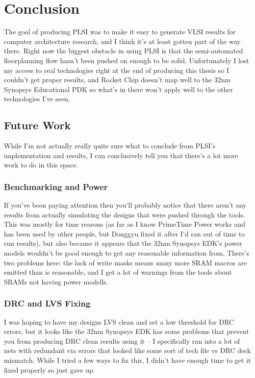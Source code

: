\documentclass{article}
\begin{document}
\chapter{Conclusion}

The goal of producing PLSI was to make it easy to generate VLSI results for
computer architecture research, and I think it's at least gotten part of the
way there.  Right now the biggest obstacle in using PLSI is that the
semi-automated floorplanning flow hasn't been pushed on enough to be solid.
Unfortunately I lost my access to real technologies right at the end of
producing this thesis so I couldn't get proper results, and Rocket Chip doesn't
map well to the 32nm Synopsys Educational PDK so what's in there won't apply
well to the other technologies I've seen.

\section{Future Work}

While I'm not actually really quite sure what to conclude from PLSI's
implementation and results, I can conclusively tell you that there's a lot more
work to do in this space.

\subsection{Benchmarking and Power}

If you've been paying attention then you'll probably notice that there aren't
any results from actually simulating the designs that were pushed through the
tools.  This was mostly for time reasons (as far as I know PrimeTime Power
works and has been used by other people, but Donggyu fixed it after I'd ran out
of time to run results), but also because it appears that the 32nm Synopsys
EDK's power models wouldn't be good enough to get any reasonable information
from.  There's two problems here: the lack of write masks means many more SRAM
macros are emitted than is reasonable, and I get a lot of warnings from the
tools about SRAMs not having power modells.

\subsection{DRC and LVS Fixing}

I was hoping to have my designs LVS clean and set a low threshold for DRC
errors, but it looks like the 32nm Synopsys EDK has some problems that prevent
you from producing DRC clean results using it -- I specifically ran into a lot
of nets with redundant via errors that looked like some sort of tech file vs
DRC deck mismatch.  While I tried a few ways to fix this, I didn't have enough
time to get it fixed properly so just gave up.
\end{document}
